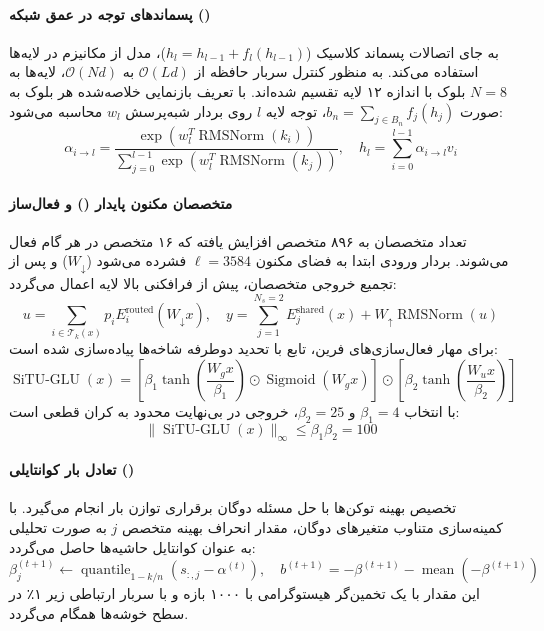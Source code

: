 \paragraph*{پسماندهای توجه در عمق شبکه ()}
به جای اتصالات پسماند کلاسیک ($h_l = h_{l-1} + f_l(h_{l-1})$)، مدل  از مکانیزم  در لایه‌ها استفاده می‌کند. به منظور کنترل سربار حافظه از $\mathcal{O}(Ld)$ به $\mathcal{O}(Nd)$، لایه‌ها به $N=8$ بلوک با اندازه ۱۲ لایه تقسیم شده‌اند. با تعریف بازنمایی خلاصه‌شده هر بلوک به صورت $b_n = \sum_{j \in B_n} f_j(h_j)$، توجه لایه $l$ روی بردار شبه‌پرسش $w_l$ محاسبه می‌شود:
\begin{equation}
    \alpha_{i \to l} = \frac{\exp\left( w_l^T \operatorname{RMSNorm}(k_i) \right)}{\sum_{j=0}^{l-1} \exp\left( w_l^T \operatorname{RMSNorm}(k_j) \right)}, \quad h_l = \sum_{i=0}^{l-1} \alpha_{i \to l} v_i
\end{equation}

\paragraph*{متخصصان مکنون پایدار () و فعال‌ساز }
تعداد متخصصان به ۸۹۶ متخصص افزایش یافته که ۱۶ متخصص در هر گام فعال می‌شوند. بردار ورودی ابتدا به فضای مکنون $\ell = 3584$ فشرده می‌شود ($W_\downarrow$) و پس از تجمیع خروجی متخصصان، پیش از فرافکنی بالا لایه  اعمال می‌گردد:
\begin{equation}
    u = \sum_{i \in \mathcal{T}_k(x)} p_i E_i^{\text{routed}}(W_\downarrow x), \quad y = \sum_{j=1}^{N_s=2} E_j^{\text{shared}}(x) + W_\uparrow \operatorname{RMSNorm}(u)
\end{equation}
برای مهار فعال‌سازی‌های فرین، تابع  با تحدید دوطرفه شاخه‌ها پیاده‌سازی شده است:
\begin{equation}
    \operatorname{SiTU-GLU}(x) = \left[ \beta_1 \tanh\left(\frac{W_g x}{\beta_1}\right) \odot \operatorname{Sigmoid}(W_g x) \right] \odot \left[ \beta_2 \tanh\left(\frac{W_u x}{\beta_2}\right) \right]
\end{equation}
با انتخاب $\beta_1 = 4$ و $\beta_2 = 25$، خروجی در بی‌نهایت محدود به کران قطعی است:
\begin{equation}
    \|\operatorname{SiTU-GLU}(x)\|_\infty \le \beta_1 \beta_2 = 100
\end{equation}

\paragraph*{تعادل بار کوانتایلی ()}
تخصیص بهینه توکن‌ها با حل مسئله دوگان برقراری توازن بار انجام می‌گیرد. با کمینه‌سازی متناوب متغیرهای دوگان، مقدار انحراف بهینه متخصص $j$ به صورت تحلیلی به عنوان کوانتایل حاشیه‌ها حاصل می‌گردد:
\begin{equation}
    \beta_j^{(t+1)} \leftarrow \operatorname{quantile}_{1 - k/n}\left( s_{:, j} - \alpha^{(t)} \right), \quad b^{(t+1)} = -\beta^{(t+1)} - \operatorname{mean}(-\beta^{(t+1)})
\end{equation}
این مقدار با یک تخمین‌گر هیستوگرامی با ۱۰۰۰ بازه و با سربار ارتباطی زیر ۱٪ در سطح خوشه‌ها همگام می‌گردد.

